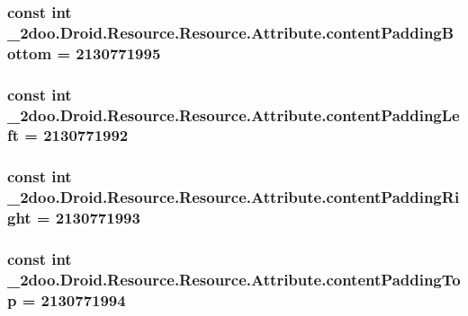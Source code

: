 \hypertarget{class__2doo_1_1_droid_1_1_resource_1_1_attribute_ac6c1c025432f02f9952e9c6d2e069ef}{
\subsubsection[{contentPaddingBottom}]{\setlength{\rightskip}{0pt plus 5cm}const int \_\-2doo.Droid.Resource.Resource.Attribute.contentPaddingBottom = 2130771995}}
\label{class__2doo_1_1_droid_1_1_resource_1_1_attribute_ac6c1c025432f02f9952e9c6d2e069ef}


\hypertarget{class__2doo_1_1_droid_1_1_resource_1_1_attribute_ff70a837fe64bdcfd66effcf494b41ec}{
\subsubsection[{contentPaddingLeft}]{\setlength{\rightskip}{0pt plus 5cm}const int \_\-2doo.Droid.Resource.Resource.Attribute.contentPaddingLeft = 2130771992}}
\label{class__2doo_1_1_droid_1_1_resource_1_1_attribute_ff70a837fe64bdcfd66effcf494b41ec}


\hypertarget{class__2doo_1_1_droid_1_1_resource_1_1_attribute_99e3bfe8921ac6159d234de58a4ac9a7}{
\subsubsection[{contentPaddingRight}]{\setlength{\rightskip}{0pt plus 5cm}const int \_\-2doo.Droid.Resource.Resource.Attribute.contentPaddingRight = 2130771993}}
\label{class__2doo_1_1_droid_1_1_resource_1_1_attribute_99e3bfe8921ac6159d234de58a4ac9a7}


\hypertarget{class__2doo_1_1_droid_1_1_resource_1_1_attribute_740ad38de42f791c97164b3be636d259}{
\subsubsection[{contentPaddingTop}]{\setlength{\rightskip}{0pt plus 5cm}const int \_\-2doo.Droid.Resource.Resource.Attribute.contentPaddingTop = 2130771994}}
\label{class__2doo_1_1_droid_1_1_resource_1_1_attribute_740ad38de42f791c97164b3be636d259}


